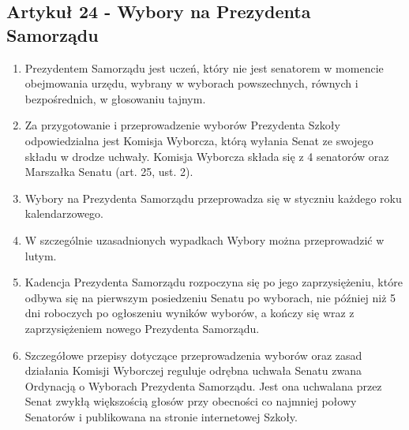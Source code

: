 \documentclass[14pt]{article}
\newenvironment{ustepy}{%
	\begin{enumerate}[leftmargin=1.5em, itemindent=1pt, labelwidth=1em, itemsep=5pt]
	}{%
	\end{enumerate}
}
\begin{document}
\subsection*{Artykuł 24 - Wybory na Prezydenta Samorządu}
\begin{ustepy}
	\item Prezydentem Samorządu jest uczeń, który nie jest senatorem w momencie obejmowania urzędu, wybrany w wyborach powszechnych, równych i bezpośrednich, w głosowaniu tajnym.
	\item Za przygotowanie i przeprowadzenie wyborów Prezydenta Szkoły odpowiedzialna jest Komisja Wyborcza, którą wyłania Senat ze swojego składu w drodze uchwały. Komisja Wyborcza składa się z 4 senatorów oraz Marszałka Senatu (art. 25, ust. 2).
	\item Wybory na Prezydenta Samorządu przeprowadza się w styczniu każdego roku kalendarzowego.
	\item W szczególnie uzasadnionych wypadkach Wybory można przeprowadzić w lutym.
	\item Kadencja Prezydenta Samorządu rozpoczyna się po jego zaprzysiężeniu, które odbywa się na pierwszym posiedzeniu Senatu po wyborach, nie później niż 5 dni roboczych po ogłoszeniu wyników wyborów, a kończy się wraz z zaprzysiężeniem nowego Prezydenta Samorządu.
	\item Szczegółowe przepisy dotyczące przeprowadzenia wyborów oraz zasad działania Komisji Wyborczej reguluje odrębna uchwała Senatu zwana Ordynacją o Wyborach Prezydenta Samorządu. Jest ona uchwalana przez Senat zwykłą większością głosów przy obecności co najmniej połowy Senatorów i publikowana na stronie internetowej Szkoły.
\end{ustepy}
\newpage
\end{document}
